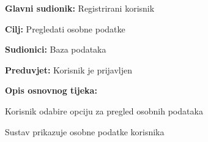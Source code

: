 	\noindent {}
	\begin{packed_item}
		
		\item \textbf{Glavni sudionik: }Registrirani korisnik
		\item  \textbf{Cilj:} Pregledati osobne podatke
		\item  \textbf{Sudionici:} Baza podataka
		\item  \textbf{Preduvjet:} Korisnik je prijavljen
		\item  \textbf{Opis osnovnog tijeka:}
		
		\item[] \begin{packed_enum}
			
			\item  Korisnik odabire opciju za pregled osobnih podataka
			\item Sustav prikazuje osobne podatke korisnika
			
		\end{packed_enum}
	\end{packed_item}

